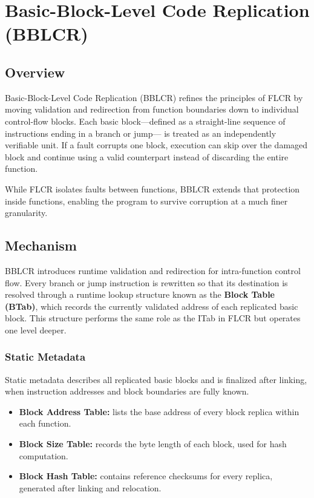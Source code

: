 \chapter{Basic-Block-Level Code Replication (BBLCR)}
\label{chap:bblcr}

\section*{Overview}
Basic-Block-Level Code Replication (BBLCR) refines the principles of FLCR by moving
validation and redirection from function boundaries down to individual control-flow blocks.
Each basic block—defined as a straight-line sequence of instructions ending in a branch or jump—
is treated as an independently verifiable unit.  If a fault corrupts one block, execution can
skip over the damaged block and continue using a valid counterpart instead of discarding the
entire function.

While FLCR isolates faults between functions, BBLCR extends that protection inside functions,
enabling the program to survive corruption at a much finer granularity.

\section*{Mechanism}
BBLCR introduces runtime validation and redirection for intra-function control flow.
Every branch or jump instruction is rewritten so that its destination is resolved through
a runtime lookup structure known as the \textbf{Block Table (BTab)}, which records the
currently validated address of each replicated basic block.
This structure performs the same role as the ITab in FLCR but operates one level deeper.

\subsection*{Static Metadata}
Static metadata describes all replicated basic blocks and is finalized after linking,
when instruction addresses and block boundaries are fully known.

\begin{itemize}
  \item \textbf{Block Address Table:} lists the base address of every block replica within each function.
  \item \textbf{Block Size Table:} records the byte length of each block, used for hash computation.
  \item \textbf{Block Hash Table:} contains reference checksums for every replica, generated after linking and relocation.
\end{itemize}

